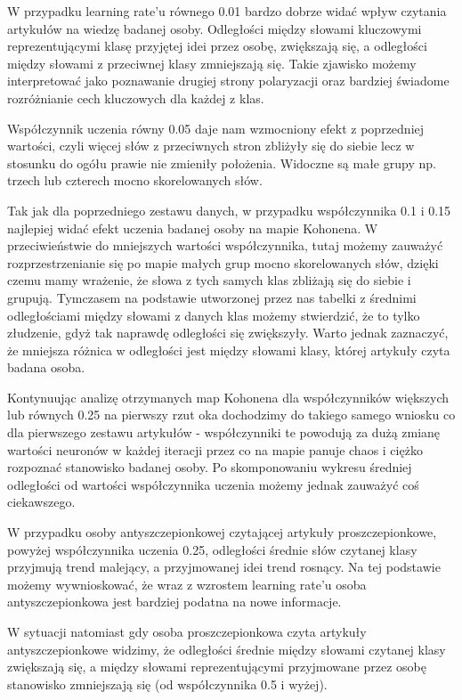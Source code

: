 \documentclass[11pt]{article}
\begin{document}
W przypadku learning rate’u równego 0.01 bardzo dobrze widać wpływ czytania artykułów na wiedzę badanej osoby. Odległości między słowami kluczowymi reprezentującymi klasę przyjętej idei przez osobę, zwiększają się, a odległości między słowami z przeciwnej klasy zmniejszają się. Takie zjawisko możemy interpretować jako poznawanie drugiej strony polaryzacji oraz bardziej świadome rozróżnianie cech kluczowych dla każdej z klas.

Współczynnik uczenia równy 0.05 daje nam wzmocniony efekt z poprzedniej wartości, czyli więcej słów z przeciwnych stron zbliżyły się do siebie lecz w stosunku do ogółu prawie nie zmieniły położenia. Widoczne są małe grupy np. trzech lub czterech mocno skorelowanych słów.

Tak jak dla poprzedniego zestawu danych, w przypadku współczynnika 0.1 i 0.15 najlepiej widać efekt uczenia badanej osoby na mapie Kohonena. W przeciwieństwie do mniejszych wartości współczynnika, tutaj możemy zauważyć rozprzestrzenianie się po mapie małych grup mocno skorelowanych słów, dzięki czemu mamy wrażenie, że słowa z tych samych klas zbliżają się do siebie i grupują. Tymczasem na podstawie utworzonej przez nas tabelki z średnimi odległościami między słowami z danych klas możemy stwierdzić, że to tylko złudzenie, gdyż tak naprawdę odległości się zwiększyły. Warto jednak zaznaczyć, że mniejsza różnica w odległości jest między słowami klasy, której artykuły czyta badana osoba.

Kontynuując analizę otrzymanych map Kohonena dla współczynników większych lub równych 0.25 na pierwszy rzut oka dochodzimy do takiego samego wniosku co dla pierwszego zestawu artykułów - współczynniki te powodują za dużą zmianę wartości neuronów w każdej iteracji przez co na mapie panuje chaos i ciężko rozpoznać stanowisko badanej osoby. Po skomponowaniu wykresu średniej odległości od wartości współczynnika uczenia możemy jednak zauważyć coś ciekawszego. 

W przypadku osoby antyszczepionkowej czytającej artykuły proszczepionkowe, powyżej współczynnika uczenia 0.25, odległości średnie słów czytanej klasy przyjmują trend malejący, a przyjmowanej idei trend rosnący. Na tej podstawie możemy wywnioskować, że wraz z wzrostem learning rate’u osoba antyszczepionkowa jest bardziej podatna na nowe informacje.

W sytuacji natomiast gdy osoba proszczepionkowa czyta artykuły antyszczepionkowe widzimy, że odległości średnie między słowami czytanej klasy zwiększają się, a między słowami reprezentującymi przyjmowane przez osobę stanowisko zmniejszają się (od współczynnika 0.5 i wyżej). 
\end{document}
